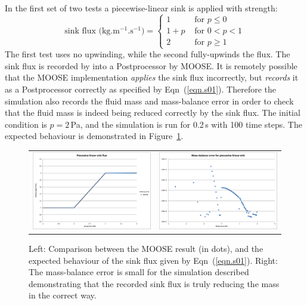 \documentclass[]{scrreprt}
\begin{document}
\noindent In the first set of two tests a piecewise-linear sink is applied with strength:
\begin{equation}
\mbox{sink flux (kg.m$^{-1}$.s$^{-1}$)} = \left\{
\begin{array}{ll}
1 & \mbox{ for } p \leq 0 \\
1+p & \mbox{ for } 0<p<1 \\
2 & \mbox{ for } p\geq 1 
\end{array}
\right.
\label{eqn.s01}
\end{equation}
The first test uses no upwinding, while the second fully-upwinds the flux.
The sink flux is recorded by into a Postprocessor by MOOSE.  It is
remotely possible that the MOOSE implementation {\em applies} the sink
flux incorrectly, but {\em records} it as a Postprocessor correctly as
specified by Eqn~(\ref{eqn.s01}).  Therefore the simulation also
records the fluid mass and mass-balance error in order to check that
the fluid mass is indeed being reduced correctly by the sink flux.
The initial condition is $p=2$\,Pa, and the simulation is run for
0.2\,s with 100 time steps.  The expected behaviour is demonstrated in
Figure~\ref{s01.fig}.

\begin{figure}[htb]
\centering
\begin{tabular}{cc}
\includegraphics[width=7cm]{s01.eps} &
\includegraphics[width=7cm]{s01_mass_bal.eps}
\end{tabular}
\caption{Left: Comparison between the MOOSE result (in dots), and the
  expected behaviour of the sink flux given by Eqn~(\ref{eqn.s01}).
  Right: The mass-balance error is small for the simulation described
  demonstrating that the recorded sink flux is truly reducing the mass
  in the correct way.}
\label{s01.fig}
\end{figure}
\end{document}
